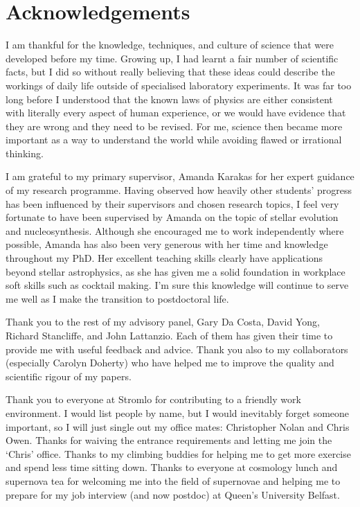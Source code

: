 \section*{Acknowledgements}
I am thankful for the knowledge, techniques, and culture of science that were developed before my time. Growing up, I had learnt a fair number of scientific facts, but I did so without really believing that these ideas could describe the workings of daily life outside of specialised laboratory experiments. It was far too long before I understood that the known laws of physics are either consistent with literally every aspect of human experience, or we would have evidence that they are wrong and they need to be revised. For me, science then became more important as a way to understand the world while avoiding flawed or irrational thinking.

I am grateful to my primary supervisor, Amanda Karakas for her expert guidance of my research programme. Having observed how heavily other students' progress has been influenced by their supervisors and chosen research topics, I feel very fortunate to have been supervised by Amanda on the topic of stellar evolution and nucleosynthesis. Although she encouraged me to work independently where possible, Amanda has also been very generous with her time and knowledge throughout my PhD. Her excellent teaching skills clearly have applications beyond stellar astrophysics, as she has given me a solid foundation in workplace soft skills such as cocktail making. I'm sure this knowledge will continue to serve me well as I make the transition to postdoctoral life.

Thank you to the rest of my advisory panel, Gary Da Costa, David Yong, Richard Stancliffe, and John Lattanzio. Each of them has given their time to provide me with useful feedback and advice. Thank you also to my collaborators (especially Carolyn Doherty) who have helped me to improve the quality and scientific rigour of my papers.

Thank you to everyone at Stromlo for contributing to a friendly work environment. I would list people by name, but I would inevitably forget someone important, so I will just single out my office mates: Christopher Nolan and Chris Owen. Thanks for waiving the entrance requirements and letting me join the `Chris' office. Thanks to my climbing buddies for helping me to get more exercise and spend less time sitting down. Thanks to everyone at cosmology lunch and supernova tea for welcoming me into the field of supernovae and helping me to prepare for my job interview (and now postdoc) at Queen's University Belfast.

